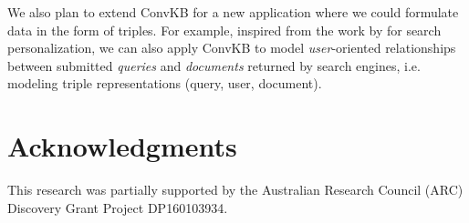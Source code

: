 \documentclass[11pt,a4paper]{article}
\begin{document}
We also plan to extend ConvKB for a new application where we could formulate data in the form of triples. For example, inspired from the work by \citet{Vu-etal-ECIR2017} for search  personalization,  we can also  apply ConvKB to model  \textit{user}-oriented relationships between submitted 
\textit{queries} and \textit{documents} returned by  search engines, i.e. modeling triple representations (query, user, document). 

\section*{Acknowledgments}
This research was partially supported by the Australian Research Council (ARC) Discovery Grant Project DP160103934.




\end{document}
